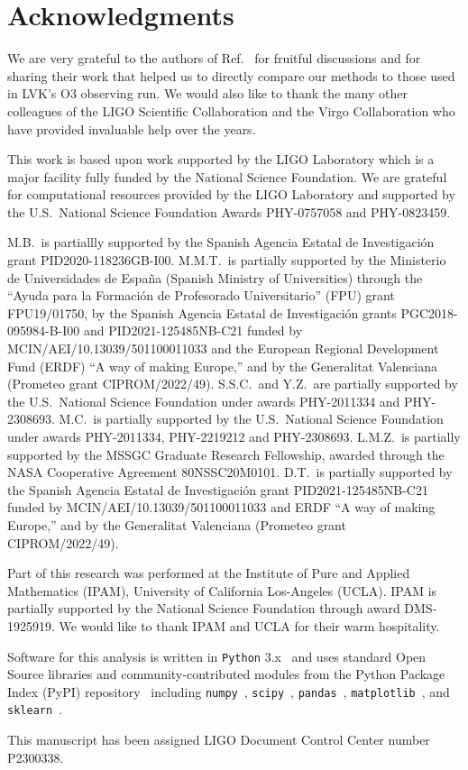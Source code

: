 \section*{Acknowledgments}

We are very grateful to the authors of Ref.~\cite{Chatterjee:2019avs} for fruitful discussions and for sharing their work that helped us to directly compare our methods to those used in
\ac{LVK}'s \ac{O3} observing run. We would also like to thank the many other colleagues of the LIGO Scientific Collaboration and the Virgo Collaboration who have provided invaluable help over
the years.

This work is based upon work supported by the LIGO Laboratory which is a major facility fully funded by the National Science Foundation. We are grateful for computational resources provided by
the LIGO Laboratory and supported by the U.S.\ National Science Foundation Awards PHY-0757058 and PHY-0823459. 

M.B.\ is partiallly supported by the Spanish Agencia Estatal de Investigaci\'on grant PID2020-118236GB-I00. M.M.T.\ is partially supported by the Ministerio de Universidades de Espa\~na (Spanish
Ministry of Universities) through the ``Ayuda para la Formaci\'on de Profesorado Universitario'' (FPU) grant FPU19/01750, by the Spanish Agencia Estatal de Investigaci\'on grants
PGC2018-095984-B-I00 and PID2021-125485NB-C21 funded by MCIN/AEI/10.13039/501100011033 and the European Regional Development Fund (ERDF) ``A way of making Europe,'' and by the Generalitat
Valenciana (Prometeo grant CIPROM/2022/49). S.S.C.\ and Y.Z.\ are partially supported by the U.S.\ National Science Foundation under awards PHY-2011334 and PHY-2308693. M.C.\ is partially
supported by the U.S.\ National Science Foundation under awards PHY-2011334, PHY-2219212 and PHY-2308693. L.M.Z.\ is partially supported by the MSSGC Graduate Research Fellowship, awarded
through the NASA Cooperative Agreement 80NSSC20M0101. D.T.~is partially supported by the Spanish Agencia Estatal de Investigaci\'on grant PID2021-125485NB-C21 funded by
MCIN/AEI/10.13039/501100011033 and ERDF ``A way of making Europe,'' and by the Generalitat Valenciana (Prometeo grant CIPROM/2022/49).

Part of this research was performed at the Institute of Pure and Applied Mathematics (IPAM),  University of California Los-Angeles (UCLA). IPAM is partially supported by the National Science
Foundation through award DMS-1925919. We would like to thank IPAM and UCLA for their warm hospitality. 

Software for this analysis is written in \texttt{Python} 3.x~\cite{python3} and uses standard Open Source libraries and community-contributed modules from the Python Package Index (PyPI)
repository~\cite{pypi} including \texttt{numpy}~\cite{harris2020array}, \texttt{scipy}~\cite{2020SciPy-NMeth}, \texttt{pandas}~\cite{reback2020pandas,mckinney-proc-scipy-2010},
\texttt{matplotlib}~\cite{Hunter:2007ouj}, and \texttt{sklearn}~\cite{scikit-learn}.

This manuscript has been assigned LIGO Document Control Center number P2300338.





